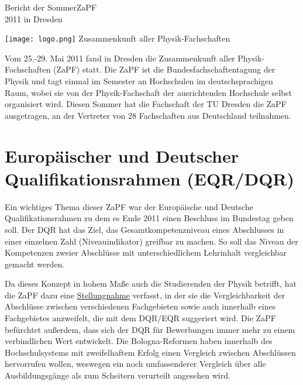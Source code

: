 \documentclass{scrartcl}
\begin{document}
% 

\begin{minipage}{0.7\textwidth}
 \Huge{Bericht der SommerZaPF\\ 2011 in Dresden} 
\end{minipage}
\hfill
\begin{minipage}{120pt}
\vspace{-1cm}
\texttt{[image: logo.png]}
\centering
\small Zusammenkunft aller Physik-Fachschaften
\end{minipage}
\vspace{7ex}

Vom 25.-29. Mai 2011 fand in Dresden die Zusammenkunft aller Physik-Fachschaften (ZaPF) statt. Die ZaPF ist die
Bundesfachschaftentagung der Physik und tagt einmal im Semester an Hochschulen im deutschsprachigen Raum, wobei sie von
der Physik-Fachschaft der ausrichtenden Hochschule selbst organisiert wird. Diesen Sommer hat die Fachschaft der TU
Dresden die ZaPF ausgetragen, an der Vertreter von 28 Fachschaften aus Deutschland teilnahmen.


\section*{Europäischer und Deutscher Qualifikationsrahmen (EQR/DQR)}
\vspace{-12pt}
Ein wichtiges Thema dieser ZaPF war der Europäische und Deutsche Qualifikationsrahmen zu dem es Ende 2011 einen
Beschluss im Bundestag geben soll. Der DQR hat das Ziel, das Gesamtkompetenzniveau eines Abschlusses in einer
einzelnen Zahl (Niveauindikator) greifbar zu machen. So soll das Niveau der Kompetenzen zweier Abschlüsse
mit unterschiedlichem Lehrinhalt vergleichbar gemacht werden.

Da dieses Konzept in hohem Maße auch die Studierenden der Physik betrifft, hat die ZaPF dazu eine
\href{http://zapfev.de/sites/default/files/2011_05_Stellungnahme_EQR-DQR_0.pdf}{Stellungnahme} verfasst, in der sie die
Vergleichbarkeit der Abschlüsse
zwischen verschiedenen Fachgebieten sowie auch innerhalb eines Fachgebietes anzweifelt, die mit dem DQR/EQR suggeriert
wird. Die ZaPF befürchtet außerdem, dass sich der DQR für Bewerbungen immer mehr zu einem verbindlichen Wert entwickelt.
Die Bologna-Reformen haben innerhalb des Hochschulsystems mit zweifelhaftem Erfolg einen Vergleich zwischen Abschlüssen
hervorrufen wollen, weswegen ein noch umfassenderer Vergleich über alle Ausbildungsgänge als zum Scheitern verurteilt
angesehen wird. 
\end{document}
